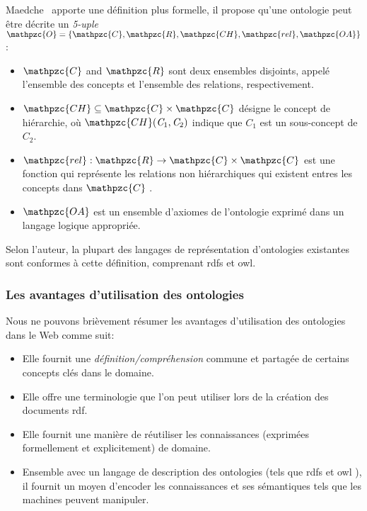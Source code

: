 Maedche~\cite{maedche2002ontology} apporte une définition plus
formelle, il propose qu'une ontologie peut être décrite un
\emph{5-uple}
$\mathpzc{O} = \{\mathpzc{C}, \mathpzc{R}, \mathpzc{CH}, \mathpzc{rel}
, \mathpzc{OA}\}$:

\SpecialItem
\begin{itemize}
\item $\mathpzc{C}$ and $\mathpzc{R}$ sont deux ensembles disjoints,
  appelé l'ensemble des concepts et l'ensemble des relations,
  respectivement.

\item $\mathpzc{CH} \subseteq \mathpzc{C} \times \mathpzc{C}$ désigne
  le concept de hiérarchie, où
  $\mathpzc{CH} (\mathit{C}_1, \mathit{C}_2)$ indique que $C_1$ est un
  sous-concept de $C_2$.

\item $\mathpzc{rel}: \mathpzc{R} \to \mathpzc{C} \times \mathpzc{C}$
  est une fonction qui représente les relations non hiérarchiques qui
  existent entres les concepts dans $\mathpzc{C}$ .

\item $\mathpzc{OA}$ est un ensemble d'axiomes de l'ontologie exprimé
  dans un langage logique appropriée.\medskip
\end{itemize}
\enddescription

Selon l'auteur, la plupart des langages de représentation d'ontologies
existantes sont conformes à cette définition, comprenant
\acrshort{rdfs} et \acrshort{owl}.

\subsubsection{Les avantages d'utilisation des ontologies}
\label{sec:semantic-web-owl2-benefits}

Nous ne pouvons brièvement résumer les avantages d'utilisation des
ontologies dans le Web comme suit:

\SpecialItem
\begin{itemize}
\item Elle fournit une \emph{définition/compréhension} commune et
  partagée de certains concepts clés dans le domaine.

\item Elle offre une terminologie que l'on peut utiliser lors de la
  création des documents \acrshort{rdf}.

\item Elle fournit une manière de réutiliser les connaissances
  (exprimées formellement et explicitement) de domaine.

\item Ensemble avec un langage de description des ontologies (tels que
  \acrshort{rdfs} et \acrshort{owl} ), il fournit un moyen d'encoder
  les connaissances et ses sémantiques tels que les machines peuvent
  manipuler.
\end{itemize}
\enddescription

